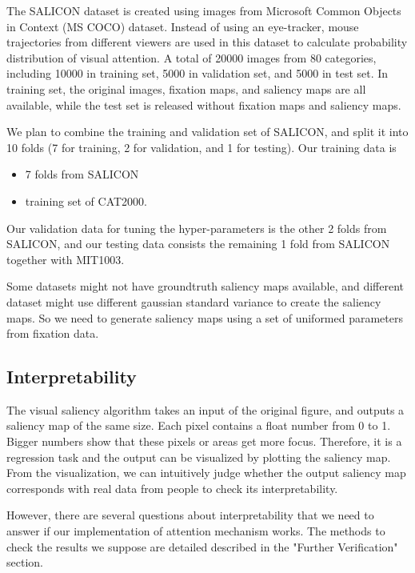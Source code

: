 \documentclass[12pt]{article}
\begin{document}
The SALICON dataset is created using images from Microsoft Common Objects in Context (MS COCO) dataset\cite{linMicrosoftCOCOCommon2015}.
Instead of using an eye-tracker, mouse trajectories from different viewers are used in this dataset
to calculate probability distribution of visual attention. A total of 20000 images from 80 categories, including
10000 in training set, 5000 in validation set, and 5000 in test set.
In training set, the original images, fixation maps, and saliency maps are all available, while
the test set is released without fixation maps and saliency maps.


We plan to combine the training and validation set of SALICON,
and split it into 10 folds (7 for training, 2 for validation, and 1 for testing).
Our training data is
\begin{itemize}
    \item 7 folds from SALICON
    \item training set of CAT2000.
\end{itemize}
Our validation data for tuning the hyper-parameters is the other 2 folds from SALICON,
and our testing data consists the remaining 1 fold from SALICON together with MIT1003.

Some datasets might not have groundtruth saliency maps available, and different dataset might use different gaussian standard variance to create the saliency maps.
So we need to generate saliency maps using a set of uniformed parameters from fixation data.


\subsection{Interpretability}

The visual saliency algorithm takes an input of the original figure, and outputs a saliency map of the same size. Each pixel contains a float number from 0 to 1. Bigger numbers show that these pixels or areas get more focus. Therefore, it is a regression task and the output can be visualized by plotting the saliency map. From the visualization, we can intuitively judge whether the output saliency map corresponds with real data from people to check its interpretability.

However, there are several questions about interpretability that we need to answer if our implementation of attention mechanism works. The methods to check the results we suppose are detailed described in the "Further Verification" section.
\end{document}

